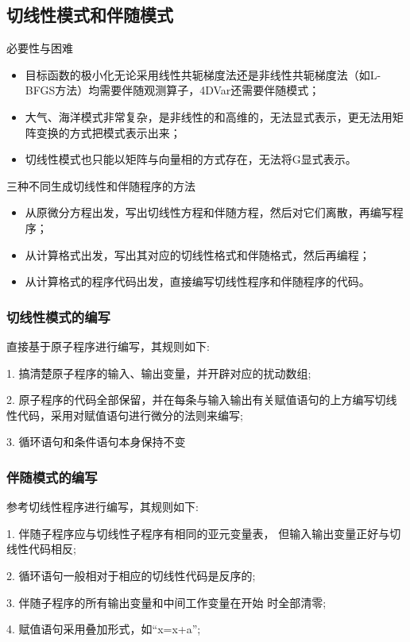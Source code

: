 \documentclass{article}
\begin{document}
\subsection{切线性模式和伴随模式}
必要性与困难
\begin{itemize}
    \item 目标函数的极小化无论采用线性共轭梯度法还是非线性共轭梯度法（如L-BFGS方法）均需要伴随观测算子，4DVar还需要伴随模式；
    \item 大气、海洋模式非常复杂，是非线性的和高维的，无法显式表示，更无法用矩阵变换的方式把模式表示出来；
    \item 切线性模式也只能以矩阵与向量相的方式存在，无法将G显式表示。
\end{itemize}

三种不同生成切线性和伴随程序的方法
\begin{itemize}
    \item 从原微分方程出发，写出切线性方程和伴随方程，然后对它们离散，再编写程序；
    \item 从计算格式出发，写出其对应的切线性格式和伴随格式，然后再编程；
    \item 从计算格式的程序代码出发，直接编写切线性程序和伴随程序的代码。
\end{itemize}

\subsubsection{切线性模式的编写}

直接基于原子程序进行编写，其规则如下:

1. 搞清楚原子程序的输入、输出变量，并开辟对应的扰动数组;

2. 原子程序的代码全部保留，并在每条与输入输出有关赋值语句的上方编写切线性代码，采用对赋值语句进行微分的法则来编写;

3. 循环语句和条件语句本身保持不变

\subsubsection{伴随模式的编写}
参考切线性程序进行编写，其规则如下:

1. 伴随子程序应与切线性子程序有相同的亚元变量表，
但输入输出变量正好与切线性代码相反;

2. 循环语句一般相对于相应的切线性代码是反序的;

3. 伴随子程序的所有输出变量和中间工作变量在开始
时全部清零;

4. 赋值语句采用叠加形式，如“x=x+a”;
\end{document}
